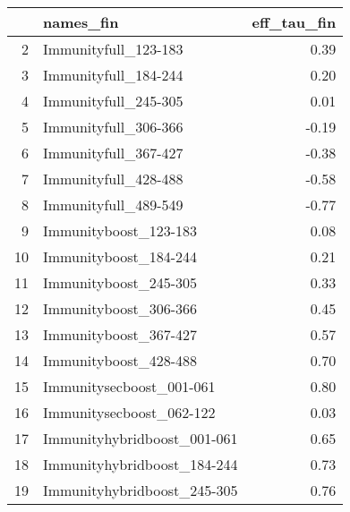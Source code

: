 \begin{table}[ht]
\centering
\begin{tabular}{rlr}
  \hline
 & names\_fin & eff\_tau\_fin \\ 
  \hline
2 & Immunityfull\_123-183 & 0.39 \\ 
  3 & Immunityfull\_184-244 & 0.20 \\ 
  4 & Immunityfull\_245-305 & 0.01 \\ 
  5 & Immunityfull\_306-366 & -0.19 \\ 
  6 & Immunityfull\_367-427 & -0.38 \\ 
  7 & Immunityfull\_428-488 & -0.58 \\ 
  8 & Immunityfull\_489-549 & -0.77 \\ 
  9 & Immunityboost\_123-183 & 0.08 \\ 
  10 & Immunityboost\_184-244 & 0.21 \\ 
  11 & Immunityboost\_245-305 & 0.33 \\ 
  12 & Immunityboost\_306-366 & 0.45 \\ 
  13 & Immunityboost\_367-427 & 0.57 \\ 
  14 & Immunityboost\_428-488 & 0.70 \\ 
  15 & Immunitysecboost\_001-061 & 0.80 \\ 
  16 & Immunitysecboost\_062-122 & 0.03 \\ 
  17 & Immunityhybridboost\_001-061 & 0.65 \\ 
  18 & Immunityhybridboost\_184-244 & 0.73 \\ 
  19 & Immunityhybridboost\_245-305 & 0.76 \\ 
   \hline
\end{tabular}
\end{table}
